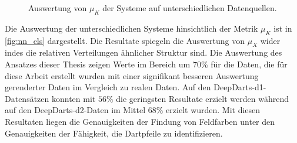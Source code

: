 \begin{figure}
    \centering
    \caption{Auswertung von $\mu_K$ der Systeme auf unterschiedlichen Datenquellen.}
    \label{fig:nn_cls}
\end{figure}

Die Auswertung der unterschiedlichen Systeme hinsichtlich der Metrik $\mu_K$ ist in \autoref{fig:nn_cls} dargestellt. Die Resultate spiegeln die Auswertung von $\mu_X$ wider indes die relativen Verteilungen ähnlicher Struktur sind. Die Auswertung des Ansatzes dieser Thesis zeigen Werte im Bereich um $70\%$ für die Daten, die für diese Arbeit erstellt wurden mit einer signifikant besseren Auswertung gerenderter Daten im Vergleich zu realen Daten. Auf den DeepDarts-d1-Datensätzen konnten mit $56\%$ die geringsten Resultate erzielt werden während auf den DeepDarts-d2-Daten im Mittel $68\%$ erzielt wurden. Mit diesen Resultaten liegen die Genauigkeiten der Findung von Feldfarben unter den Genauigkeiten der Fähigkeit, die Dartpfeile zu identifizieren.

